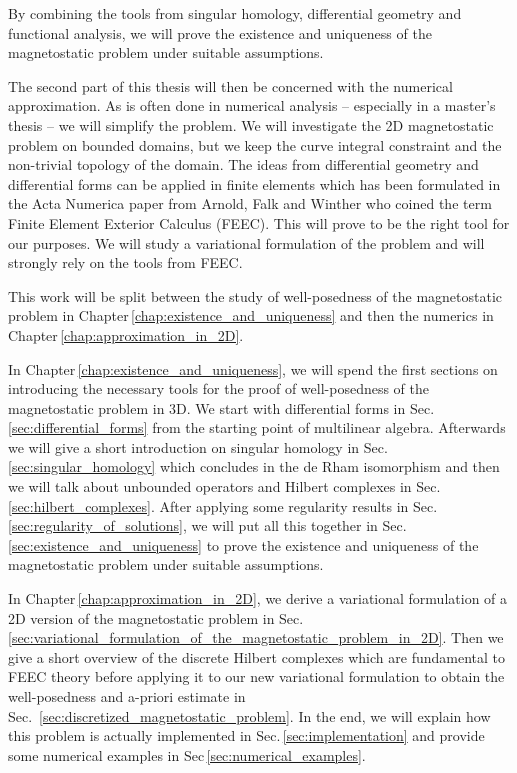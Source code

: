 \documentclass[../master_thesis.tex]{subfiles}
\begin{document}
By combining the tools from singular homology, differential geometry and 
functional analysis, we will prove the existence and uniqueness of the magnetostatic problem 
under suitable assumptions.

The second part of this thesis will then be concerned with the numerical approximation. 
As is often done in numerical analysis -- especially in a master's thesis -- we 
will simplify the problem. We will investigate the 2D magnetostatic problem on bounded domains, 
but we keep the curve integral 
constraint and the non-trivial topology of the domain. The ideas from differential geometry and 
differential forms can be applied in finite elements
which has been formulated in the Acta Numerica paper from Arnold, Falk and Winther 
\cite{arnold_falk_winther} who coined the term Finite Element Exterior Calculus (FEEC). This will prove to 
be the right tool for our purposes. We will study a variational formulation of the problem 
and will strongly rely on the tools from FEEC.


This work will be split between the study of well-posedness of the magnetostatic problem 
in Chapter\,\ref{chap:existence_and_uniqueness} and then the numerics in Chapter\,\ref{chap:approximation_in_2D}.

In Chapter\,\ref{chap:existence_and_uniqueness}, we will spend the first sections on 
introducing the necessary tools for the proof of well-posedness of the magnetostatic problem 
in 3D. We start with differential forms in Sec.\,\ref{sec:differential_forms} from the starting point 
of multilinear algebra. Afterwards we will give a short introduction on 
singular homology in Sec.\,\ref{sec:singular_homology} which concludes in the de Rham isomorphism and then 
we will talk about unbounded operators and Hilbert 
complexes in Sec.\,\ref{sec:hilbert_complexes}. After applying some regularity results in Sec.\,\ref{sec:regularity_of_solutions},
we will put all this together in Sec.\,\ref{sec:existence_and_uniqueness} to prove the existence and uniqueness 
of the magnetostatic problem under suitable assumptions.

In Chapter\,\ref{chap:approximation_in_2D}, we derive a variational formulation of a 2D version of the 
magnetostatic problem in Sec.\,\ref{sec:variational_formulation_of_the_magnetostatic_problem_in_2D}. Then we give a short overview of the discrete Hilbert complexes 
which are fundamental to FEEC theory before applying it to our new variational formulation 
to obtain the well-posedness and a-priori estimate in Sec.~\ref{sec:discretized_magnetostatic_problem}. 
In the end, we will explain how this 
problem is actually implemented in Sec.\,\ref{sec:implementation} 
and provide some numerical examples in Sec\,\ref{sec:numerical_examples}.
\end{document}
